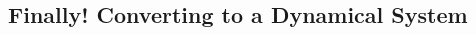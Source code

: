 \documentclass{fkpaper}
\begin{document}
\begin{multicols}{2}
\subsection{Finally! Converting to a Dynamical System}









\end{multicols}
\end{document}
